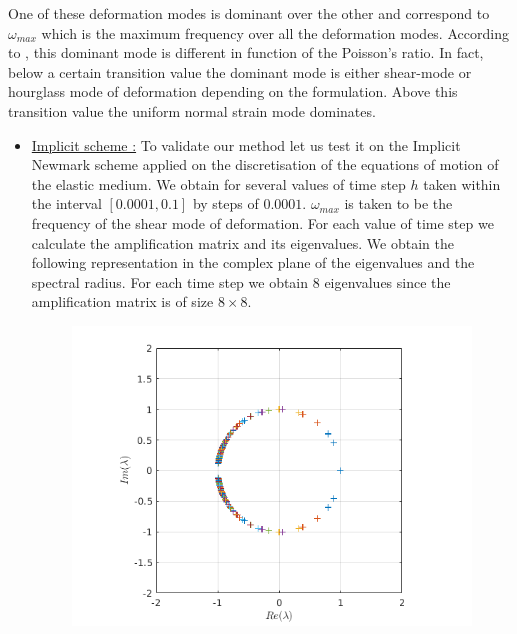 One of these deformation modes is dominant over the other and correspond to $\omega_{max}$ which is the maximum frequency over all the deformation modes. 
According to \cite{Ling2002}, this dominant mode is different in function of the Poisson's ratio. In fact, below a certain transition value the dominant mode is either shear-mode or hourglass mode of deformation depending on the formulation. Above this transition value the uniform normal strain mode dominates. \\
\begin{itemize}
\item \underline{Implicit scheme :} To validate our method let us test it on the Implicit Newmark scheme applied on the discretisation of the equations of motion of the elastic medium. We obtain for several values of time step $h$ taken within the interval $[0.0001, 0.1]$ by steps of $0.0001$. $\omega_{max}$ is taken to be the frequency of the shear mode of deformation. For each value of time step we calculate the amplification matrix and its eigenvalues. We obtain the following representation in the complex plane of the eigenvalues and the spectral radius. For each time step we obtain $8$ eigenvalues since the amplification matrix is of size $8 \times 8$.
\begin{figure}[H]
\centering
\begin{minipage}{.5\textwidth}
  \centering
  \includegraphics[width=.98\linewidth]{images/eig_med_imp.png}
  \label{fig:eig_med_imp}
\end{minipage}%
\begin{minipage}{.5\textwidth}

\end{minipage}
\end{figure}
\end{itemize}
